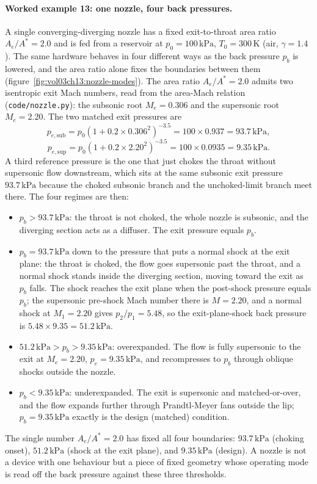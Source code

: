 \paragraph{Worked example 13: one nozzle, four back pressures.} A
single converging-diverging nozzle has a fixed exit-to-throat area
ratio $A_e/A^* = 2.0$ and is fed from a reservoir at
$p_0 = 100\,\text{kPa}$, $T_0 = 300\,\si{\kelvin}$ (air,
$\gamma = 1.4$). The same hardware behaves in four different ways as
the back pressure $p_b$ is lowered, and the area ratio alone fixes the
boundaries between them (figure~\ref{fig:vol03ch13:nozzle-modes}). The
area ratio $A_e/A^* = 2.0$ admits two isentropic exit Mach numbers,
read from the area-Mach relation (\texttt{code/nozzle.py}): the
subsonic root $M_e = 0.306$ and the supersonic root $M_e = 2.20$. The
two matched exit pressures are
\[
p_{e,\text{sub}} = p_0(1 + 0.2\times 0.306^2)^{-3.5} = 100\times 0.937
= 93.7\,\text{kPa},
\]
\[
p_{e,\text{sup}} = p_0(1 + 0.2\times 2.20^2)^{-3.5} = 100\times 0.0935
= 9.35\,\text{kPa}.
\]
A third reference pressure is the one that just chokes the throat
without supersonic flow downstream, which sits at the same subsonic
exit pressure $93.7\,\text{kPa}$ because the choked subsonic branch and
the unchoked-limit branch meet there. The four regimes are then:
\begin{itemize}[leftmargin=*]
  \item $p_b > 93.7\,\text{kPa}$: the throat is not choked, the whole
    nozzle is subsonic, and the diverging section acts as a diffuser.
    The exit pressure equals $p_b$.
  \item $p_b = 93.7\,\text{kPa}$ down to the pressure that puts a normal
    shock at the exit plane: the throat is choked, the flow goes
    supersonic past the throat, and a normal shock stands inside the
    diverging section, moving toward the exit as $p_b$ falls. The
    shock reaches the exit plane when the post-shock pressure equals
    $p_b$; the supersonic pre-shock Mach number there is $M = 2.20$, and
    a normal shock at $M_1 = 2.20$ gives $p_2/p_1 = 5.48$, so the
    exit-plane-shock back pressure is $5.48\times 9.35 =
    51.2\,\text{kPa}$.
  \item $51.2\,\text{kPa} > p_b > 9.35\,\text{kPa}$: overexpanded. The
    flow is fully supersonic to the exit at $M_e = 2.20$,
    $p_e = 9.35\,\text{kPa}$, and recompresses to $p_b$ through oblique
    shocks outside the nozzle.
  \item $p_b < 9.35\,\text{kPa}$: underexpanded. The exit is supersonic
    and matched-or-over, and the flow expands further through
    Prandtl-Meyer fans outside the lip; $p_b = 9.35\,\text{kPa}$
    exactly is the design (matched) condition.
\end{itemize}
The single number $A_e/A^* = 2.0$ has fixed all four boundaries:
$93.7\,\text{kPa}$ (choking onset), $51.2\,\text{kPa}$ (shock at the
exit plane), and $9.35\,\text{kPa}$ (design). A nozzle is not a
device with one behaviour but a piece of fixed geometry whose
operating mode is read off the back pressure against these three
thresholds.

